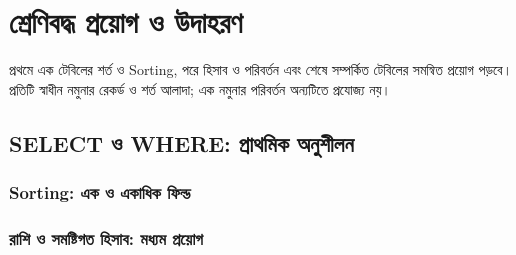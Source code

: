 \section{শ্রেণিবদ্ধ প্রয়োগ ও উদাহরণ}
\label{sec:ch06-applications}
প্রথমে এক টেবিলের শর্ত ও Sorting, পরে হিসাব ও পরিবর্তন এবং শেষে সম্পর্কিত টেবিলের সমন্বিত প্রয়োগ পড়বে। প্রতিটি স্বাধীন নমুনার রেকর্ড ও শর্ত আলাদা; এক নমুনার পরিবর্তন অন্যটিতে প্রযোজ্য নয়।
\subsection{SELECT ও WHERE: প্রাথমিক অনুশীলন}
\begingroup
\let\subsection\subsubsection



\endgroup
\subsection{Sorting: এক ও একাধিক ফিল্ড}
\begingroup
\let\subsection\subsubsection




\endgroup
\subsection{রাশি ও সমষ্টিগত হিসাব: মধ্যম প্রয়োগ}
\begingroup
\let\subsection\subsubsection


\endgroup
